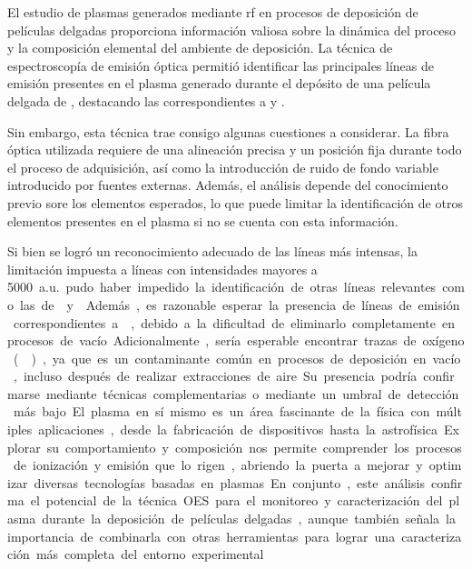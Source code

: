 \documentclass[12pt]{IEEEtran}
\begin{document}
El estudio de plasmas generados mediante rf en procesos de deposición de películas delgadas
proporciona información valiosa sobre la dinámica del proceso y la composición elemental
del ambiente de deposición. La técnica de espectroscopía de emisión óptica permitió
identificar las principales líneas de emisión presentes en el plasma generado durante
el depósito de una película delgada de , destacando las correspondientes a
 y .

Sin embargo, esta técnica trae consigo algunas cuestiones a considerar.
La fibra óptica utilizada requiere de una alineación precisa y un posición fija
durante todo el proceso de adquisición, así como la introducción de ruido de fondo
variable introducido por fuentes externas. Además, el análisis depende del
conocimiento previo sore los elementos esperados, lo que puede limitar la identificación
de otros elementos presentes en el plasma si no se cuenta con esta información.

Si bien se logró un reconocimiento adecuado de las líneas más intensas, la limitación
impuesta a líneas con intensidades mayores a \qty{5000}{a.u.} pudo haber impedido
la identificación de otras líneas relevantes como las de  y .
Además, es razonable esperar la presencia de líneas de emisión correspondientes a ,
debido a la dificultad de eliminarlo completamente en procesos de vacío.

Adicionalmente, sería esperable encontrar trazas de oxígeno (),
ya que es un contaminante común en procesos de deposición en vacío,
incluso después de realizar extracciones de aire.
Su presencia podría confirmarse mediante técnicas complementarias o mediante un umbral
de detección más bajo.

El plasma en sí mismo es un área fascinante de la física con múltiples aplicaciones,
desde la fabricación de dispositivos hasta la astrofísica. Explorar su comportamiento y composición nos permite comprender los procesos de ionización y emisión que lo rigen, abriendo la puerta a mejorar y optimizar diversas tecnologías basadas en plasmas.

En conjunto, este análisis confirma el potencial de la técnica OES para el monitoreo
y caracterización del plasma durante la deposición de películas delgadas,
aunque también señala la importancia de combinarla con otras herramientas
para lograr una caracterización más completa del entorno experimental.
\nocite{*}
\clearpage
\printbibliography
\end{document}
